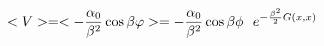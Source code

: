 \begin{equation}
< V > = < - {\alpha_0 \over \beta^2} \cos \beta \varphi > =
  - {\alpha_0 \over \beta^2} \cos \beta \phi~~ e^{- {\beta^2 \over 2}
G(x,x)}
\end{equation}

